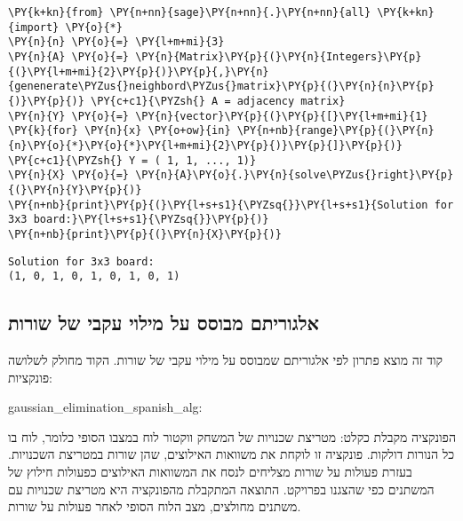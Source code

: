 \begin{english}
    \begin{tcolorbox}[breakable, size=fbox, boxrule=1pt, pad at break*=1mm,colback=cellbackground, colframe=cellborder]
\begin{Verbatim}[commandchars=\\\{\}]
\PY{k+kn}{from} \PY{n+nn}{sage}\PY{n+nn}{.}\PY{n+nn}{all} \PY{k+kn}{import} \PY{o}{*}
\PY{n}{n} \PY{o}{=} \PY{l+m+mi}{3}
\PY{n}{A} \PY{o}{=} \PY{n}{Matrix}\PY{p}{(}\PY{n}{Integers}\PY{p}{(}\PY{l+m+mi}{2}\PY{p}{)}\PY{p}{,}\PY{n}{genenerate\PYZus{}neighbord\PYZus{}matrix}\PY{p}{(}\PY{n}{n}\PY{p}{)}\PY{p}{)} \PY{c+c1}{\PYZsh{} A = adjacency matrix}
\PY{n}{Y} \PY{o}{=} \PY{n}{vector}\PY{p}{(}\PY{p}{[}\PY{l+m+mi}{1} \PY{k}{for} \PY{n}{x} \PY{o+ow}{in} \PY{n+nb}{range}\PY{p}{(}\PY{n}{n}\PY{o}{*}\PY{o}{*}\PY{l+m+mi}{2}\PY{p}{)}\PY{p}{]}\PY{p}{)} \PY{c+c1}{\PYZsh{} Y = ( 1, 1, ..., 1)}
\PY{n}{X} \PY{o}{=} \PY{n}{A}\PY{o}{.}\PY{n}{solve\PYZus{}right}\PY{p}{(}\PY{n}{Y}\PY{p}{)}
\PY{n+nb}{print}\PY{p}{(}\PY{l+s+s1}{\PYZsq{}}\PY{l+s+s1}{Solution for 3x3 board:}\PY{l+s+s1}{\PYZsq{}}\PY{p}{)}
\PY{n+nb}{print}\PY{p}{(}\PY{n}{X}\PY{p}{)}
\end{Verbatim}
\end{tcolorbox}

    \begin{Verbatim}[commandchars=\\\{\}]
Solution for 3x3 board:
(1, 0, 1, 0, 1, 0, 1, 0, 1)
    \end{Verbatim}
\end{english}

\newpage
    \hypertarget{solver-based-on-calculating-raw-by-raw}{%
\subsection{אלגוריתם מבוסס על מילוי עקבי של שורות}\label{solver-based-on-calculating-raw-by-raw}}
קוד זה מוצא פתרון לפי אלגוריתם שמבוסס על מילוי עקבי של שורות.
הקוד מחולק לשלושה פונקציות:

\begin{english}
    gaussian\_elimination\_spanish\_alg:
\end{english}

הפונקציה מקבלת כקלט:
מטריצת שכנויות של המשחק ווקטור לוח במצבו הסופי כלומר, לוח בו כל הנורות דולקות.
פונקציה זו
לוקחת את משוואות האילוצים, שהן שורות במטריצת השכנויות.
בעזרת פעולות על שורות מצליחים לנסח את המשוואות האילוצים  
כפעולות חילוץ של המשתנים
כפי שהצגנו בפרויקט.
התוצאה המתקבלת מהפונקציה היא 
מטריצת שכנויות עם משתנים מחולצים,
מצב הלוח הסופי לאחר פעולות על שורות.

